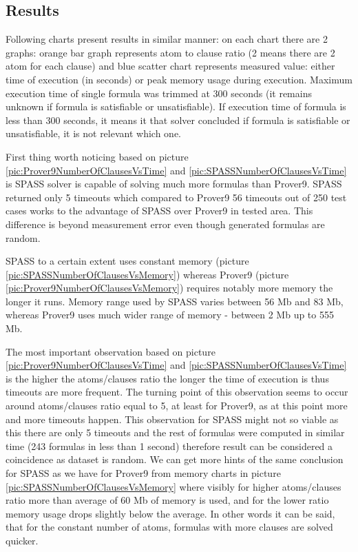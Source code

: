 \subsection{Results}
\label{sec:Results}

Following charts present results in similar manner: on each chart there are 2 graphs: orange bar graph represents atom to clause ratio (2 means there are 2 atom for each clause) and blue scatter chart represents measured value: either time of execution (in seconds) or peak memory usage during execution. Maximum execution time of single formula was trimmed at 300 seconds (it remains unknown if formula is satisfiable or unsatisfiable). If execution time of formula is less than 300 seconds, it means it that solver concluded if formula is satisfiable or unsatisfiable, it is not relevant which one.

First thing worth noticing based on picture \ref{pic:Prover9NumberOfClausesVsTime} and \ref{pic:SPASSNumberOfClausesVsTime} is SPASS solver is capable of solving much more formulas than Prover9. SPASS returned only 5 timeouts which compared to Prover9 56 timeouts out of 250 test cases works to the advantage of SPASS over Prover9 in tested area. This difference is beyond measurement error even though generated formulas are random. 

SPASS to a certain extent uses constant memory (picture \ref{pic:SPASSNumberOfClausesVsMemory}) whereas Prover9 (picture \ref{pic:Prover9NumberOfClausesVsMemory}) requires notably more memory the longer it runs. Memory range used by SPASS varies between 56 Mb and 83 Mb, whereas Prover9 uses much wider range of memory - between 2 Mb up to 555 Mb.

The most important observation based on picture \ref{pic:Prover9NumberOfClausesVsTime} and \ref{pic:SPASSNumberOfClausesVsTime} is the higher the atoms/clauses ratio the longer the time of execution is thus timeouts are more frequent. The turning point of this observation seems to occur around atoms/clauses ratio equal to 5, at least for Prover9, as at this point more and more timeouts happen. This observation for SPASS might not so viable as this there are only 5 timeouts and the rest of formulas were computed in similar time (243 formulas in less than 1 second) therefore result can be considered a coincidence as dataset is random. We can get more hints of the same conclusion for SPASS as we have for Prover9 from memory charts in picture \ref{pic:SPASSNumberOfClausesVsMemory} where visibly for higher atoms/clauses ratio more than average of 60 Mb of memory is used, and for the lower ratio memory usage drops slightly below the average.
In other words it can be said, that for the constant number of atoms, formulas with more clauses are solved quicker.

